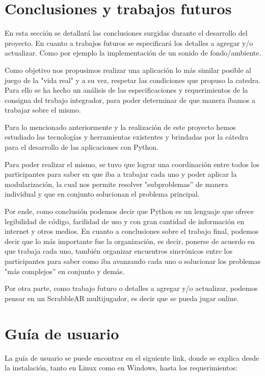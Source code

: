 \documentclass[12pt]{article}
\begin{document}
\section{Conclusiones y trabajos futuros}

En esta sección se detallará las conclusiones surgidas durante el desarrollo del proyecto. En cuanto a trabajos futuros se especificará los detalles a agregar y/o actualizar. Como por ejemplo la implementación de un sonido de fondo/ambiente.

Como objetivo nos propusimos realizar una aplicación lo más similar posible al juego de la "vida real" y a su vez, respetar las condiciones que propuso la catedra. Para ello se ha hecho un análisis de las especificaciones y requerimientos de la consigna del trabajo integrador, para poder determinar de que manera íbamos a trabajar sobre el mismo.

Para lo mencionado anteriormente y la realización de este proyecto hemos estudiado las tecnologías y herramientas existentes y brindadas por la cátedra para el desarrollo de las aplicaciones con Python.


Para poder realizar el mismo, se tuvo que lograr una coordinación entre todos los participantes para saber en que iba a trabajar cada uno y poder aplicar la modularización, la cual nos permite resolver "subproblemas” de manera individual y que en conjunto solucionan el problema principal.


Por ende, como conclusión podemos decir que Python es un lenguaje que ofrece legibilidad de código, facilidad de uso y con gran cantidad de información en internet y otros medios.
En cuanto a conclusiones sobre el trabajo final, podemos decir que lo más importante fue la organización, es decir, ponerse de acuerdo en que trabaja cada uno, también organizar encuentros sincrónicos entre los participantes para saber como iba avanzando cada uno o solucionar los problemas "más complejos” en conjunto y demás.

Por otra parte, como trabajo futuro o detalles a agregar y/o actualizar, podemos pensar en un ScrabbleAR multijugador, es decir que se pueda jugar online.



\newpage
\section{Guía de usuario}

La guía de usuario se puede encontrar en el siguiente link, donde se explica desde la instalación, tanto en Linux como en Windows, hasta los requerimientos:
\newline
\end{document}
